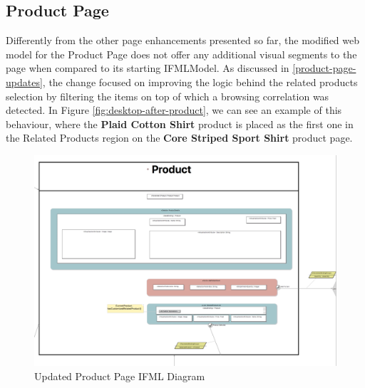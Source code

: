 \newpage
\subsection{Product Page}

Differently from the other page enhancements presented so far, the modified web model for the Product Page does not offer any additional visual segments to the page when compared to its starting IFMLModel. As discussed in \ref{product-page-updates}, the change focused on improving the logic behind the related products selection by filtering the items on top of which a browsing correlation was detected. In Figure \ref{fig:desktop-after-product}, we can see an example of this behaviour, where the \textbf{Plaid Cotton Shirt} product is placed as the first one in the Related Products region on the \textbf{Core Striped Sport Shirt} product page.

\vspace{0.5cm}
\begin{figure}[H]
  \centering
    \includegraphics[width=13cm]{images/diagrams/after/ifml-product.png}
  \caption{Updated Product Page IFML Diagram}
  \label{fig:ifml-after-product}
\end{figure}

